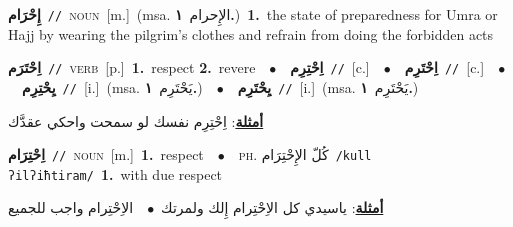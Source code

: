 \documentclass[10pt,a4paper,twoside]{article} %
\begin{document}
\begin{multicols}{2}
{\setlength\topsep{0pt}\textbf{\foreignlanguage{arabic}{إِحْرَام}}\ {\color{gray}\texttt{//}\color{black}}\ \textsc{noun}\ [m.]\ \color{gray}(msa. \foreignlanguage{arabic}{الإِحرام}~\foreignlanguage{arabic}{\textbf{١.}})\color{black}\ \textbf{1.}~the state of preparedness for Umra or Hajj by wearing the pilgrim's clothes and refrain from doing the forbidden acts\ } \vspace{2mm}

{\setlength\topsep{0pt}\textbf{\foreignlanguage{arabic}{اِحْتَرَم}}\ {\color{gray}\texttt{//}\color{black}}\ \textsc{verb}\ [p.]\ \textbf{1.}~respect  \textbf{2.}~revere\ \ $\bullet$\ \ \setlength\topsep{0pt}\textbf{\foreignlanguage{arabic}{اِحْتِرِم}}\ {\color{gray}\texttt{//}\color{black}}\ [c.]\ \ $\bullet$\ \ \setlength\topsep{0pt}\textbf{\foreignlanguage{arabic}{اِحْتَرِم}}\ {\color{gray}\texttt{//}\color{black}}\ [c.]\ \ $\bullet$\ \ \setlength\topsep{0pt}\textbf{\foreignlanguage{arabic}{يِحْتِرِم}}\ {\color{gray}\texttt{//}\color{black}}\ [i.]\ \color{gray}(msa. \foreignlanguage{arabic}{يَحْتَرِم}~\foreignlanguage{arabic}{\textbf{١.}})\color{black}\ \ $\bullet$\ \ \setlength\topsep{0pt}\textbf{\foreignlanguage{arabic}{يِحْتَرِم}}\ {\color{gray}\texttt{//}\color{black}}\ [i.]\ \color{gray}(msa. \foreignlanguage{arabic}{يَحْتَرِم}~\foreignlanguage{arabic}{\textbf{١.}})\color{black}\  \begin{flushright}\color{gray}\foreignlanguage{arabic}{\textbf{\underline{\foreignlanguage{arabic}{أمثلة}}}: اِحْتِرِم نفسك لو سمحت واحكي عقدَّك}\end{flushright}\color{black}} \vspace{2mm}

{\setlength\topsep{0pt}\textbf{\foreignlanguage{arabic}{اِحْتِرَام}}\ {\color{gray}\texttt{//}\color{black}}\ \textsc{noun}\ [m.]\ \textbf{1.}~respect\ \ $\bullet$\ \ \textsc{ph.} \color{gray} \foreignlanguage{arabic}{كُلّ الإِحْتِرَام}\color{black}\ {\color{gray}\texttt{/{\sffamily kull ʔilʔiħtiram}/}\color{black}}\ \textbf{1.}~with due respect\  \begin{flushright}\color{gray}\foreignlanguage{arabic}{\textbf{\underline{\foreignlanguage{arabic}{أمثلة}}}: ياسيدي كل الاِحْتِرام إِلك ولمرتك\ $\bullet$\ \  الاِحْتِرام واجب للجميع}\end{flushright}\color{black}} \vspace{2mm}


\end{multicols}
\end{document}
